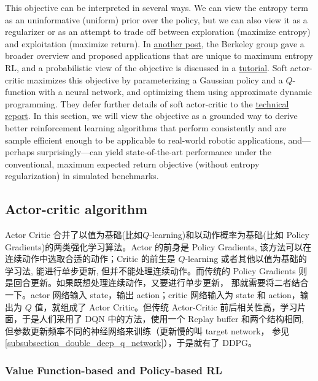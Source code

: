 This objective can be interpreted in several ways. We can view the entropy 
term as an uninformative (uniform) prior over the policy, but we can also 
view it as a regularizer or as an attempt to trade off between exploration 
(maximize entropy) and exploitation (maximize return). In 
\href{https://bair.berkeley.edu/blog/2017/10/06/soft-q-learning/}{another post}, 
the Berkeley group gave a broader overview and proposed applications that are 
unique to maximum entropy RL, and a probabilistic view of the objective is 
discussed in a \href{https://arxiv.org/abs/1805.00909}{tutorial}. 
Soft actor-critic maximizes this objective by parameterizing a Gaussian policy 
and a $Q$-function with a neural network, and optimizing them using approximate 
dynamic programming. They defer further details of soft actor-critic to the 
\href{https://arxiv.org/abs/1812.05905}{technical report}. In this section, 
we will view the objective as a grounded way to derive better reinforcement 
learning algorithms that perform consistently and are sample efficient enough 
to be applicable to real-world robotic applications, and—perhaps surprisingly—can 
yield state-of-the-art performance under the conventional, maximum expected 
return objective (without entropy regularization) in simulated benchmarks.


\subsection{Actor-critic algorithm}

Actor Critic 合并了以值为基础(比如$Q$-learning)和以动作概率为基础(比如 Policy 
Gradients)的两类强化学习算法。Actor 的前身是 Policy Gradients, 
该方法可以在连续动作中选取合适的动作；Critic 的前生是 $Q$-learning 
或者其他以值为基础的学习法, 能进行单步更新, 但并不能处理连续动作。而传统的 Policy 
Gradients 则是回合更新。如果既想处理连续动作，又要进行单步更新，
那就需要将二者结合一下。actor 网络输入 state，输出 action；critic 网络输入为 state
和 action，输出为 $Q$ 值，就组成了 Actor Critic。但传统 Actor-Critic 
前后相关性高，学习片面，于是人们采用了 DQN 中的方法，使用一个 Replay buffer 
和两个结构相同, 但参数更新频率不同的神经网络来训练（更新慢的叫 target network，
参见 \ref{subsubsection_double_deep_q_network}），于是就有了 DDPG。

\subsubsection{Value Function-based and Policy-based RL}

